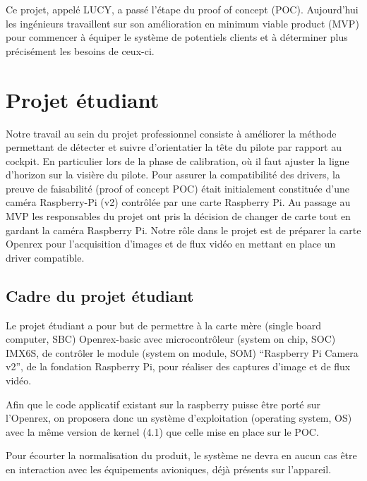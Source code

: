 Ce projet, appelé LUCY, a passé l’étape du proof of concept (POC). Aujourd’hui les ingénieurs
travaillent sur son amélioration en minimum viable product (MVP) pour commencer à équiper le système
de potentiels clients et à déterminer plus précisément les besoins de ceux-ci. 

\section{Projet étudiant}

Notre travail au sein du projet professionnel consiste à améliorer la méthode permettant de détecter et suivre
d’orientatier la tête du pilote par rapport au cockpit. En particulier lors de la phase de
calibration, où il faut ajuster la ligne d’horizon sur la visière du pilote. Pour assurer la
compatibilité des drivers, la preuve de faisabilité (proof of concept POC) était initialement
constituée d’une caméra Raspberry-Pi (v2) contrôlée par une carte Raspberry Pi. Au passage au MVP
les responsables du projet ont pris la décision de changer de carte tout en gardant la caméra
Raspberry Pi. Notre rôle dans le projet est de préparer la carte Openrex pour l’acquisition d’images
et de flux vidéo en mettant en place un driver compatible. 


\subsection{Cadre du projet étudiant}

Le projet étudiant a pour but de permettre à la carte mère (single board computer, SBC) Openrex-basic
avec microcontrôleur (system on chip, SOC) IMX6S, de contrôler le module (system on module, SOM)
“Raspberry Pi Camera v2”, de la fondation Raspberry Pi, pour réaliser des captures d’image et de flux
vidéo. \medskip

Afin que le code applicatif existant sur la raspberry puisse être porté sur l’Openrex, on proposera
donc un système d’exploitation (operating system, OS) avec la même version de kernel (4.1) que celle
mise en place sur le POC.\medskip

Pour écourter la normalisation du produit, le système ne devra en aucun cas être en interaction avec
les équipements avioniques, déjà présents sur l’appareil.
